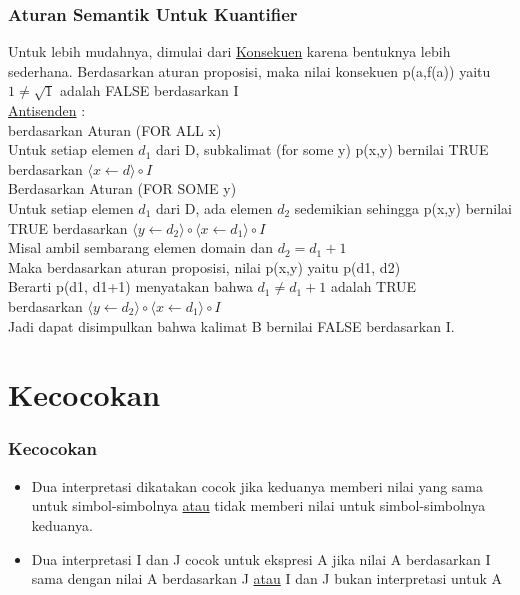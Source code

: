 \documentclass[handout]{beamer}
\theoremstyle{definition}
\theoremstyle{example}
\begin{document}
\begin{frame}
	\frametitle{Aturan Semantik Untuk Kuantifier}
    Untuk lebih mudahnya, dimulai dari \underline{Konsekuen} karena bentuknya lebih sederhana. Berdasarkan aturan proposisi, maka nilai konsekuen p(a,f(a)) yaitu $1 \neq \sqrt{1}$ adalah 
    FALSE berdasarkan I\\
    \vspace{1mm}
    \underline{Antisenden} :\\
    berdasarkan Aturan (FOR ALL x)\\
    Untuk setiap elemen $d_1$ dari D, subkalimat (for some y) p(x,y) bernilai TRUE berdasarkan $\langle x \leftarrow d \rangle \circ I $\\
    \vspace{0.5mm}
    Berdasarkan Aturan (FOR SOME y)\\
    Untuk setiap elemen $d_1$ dari D, ada elemen $d_2$ sedemikian sehingga p(x,y) bernilai TRUE berdasarkan $\langle y \leftarrow d_2 \rangle \circ \langle x \leftarrow d_1 \rangle \circ I $\\
    \vspace{1mm}
    Misal ambil sembarang elemen domain dan $d_2 = d_1 + 1$\\
    Maka berdasarkan aturan proposisi, nilai p(x,y) yaitu p(d1, d2)\\
    Berarti p(d1, d1+1) menyatakan bahwa $d_1 \neq d_1 + 1$ adalah TRUE\\
    berdasarkan $\langle y \leftarrow d_2 \rangle \circ \langle x \leftarrow d_1 \rangle \circ I $\\
    \vspace{0.5mm}
    Jadi dapat disimpulkan bahwa kalimat B bernilai FALSE berdasarkan I.   
    
\end{frame}

\section{Kecocokan}
\begin{frame}
  \frametitle{Kecocokan}
  \begin{itemize}
  	\item Dua interpretasi dikatakan cocok jika keduanya memberi nilai yang sama untuk simbol-simbolnya \underline{atau} tidak memberi nilai untuk simbol-simbolnya keduanya. 
  	
  	\item Dua interpretasi I dan J cocok untuk ekspresi A jika nilai A berdasarkan I sama dengan nilai A berdasarkan J \underline{atau}
  	I dan J bukan interpretasi untuk A
  \end{itemize}
\end{frame}  
\end{document}
